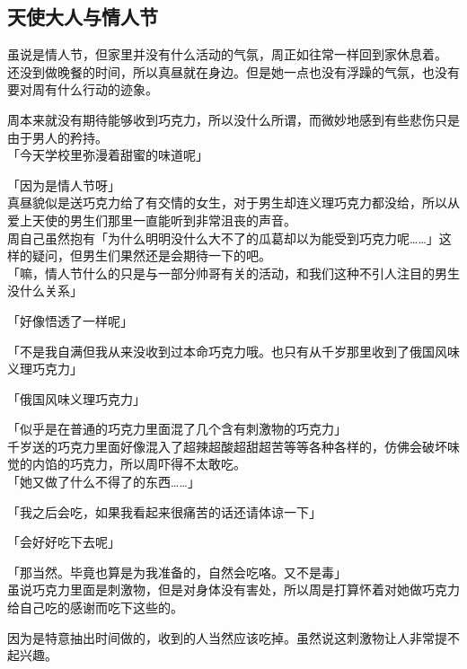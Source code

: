 \subsection{天使大人与情人节}

虽说是情人节，但家里并没有什么活动的气氛，周正如往常一样回到家休息着。\\

还没到做晚餐的时间，所以真昼就在身边。但是她一点也没有浮躁的气氛，也没有要对周有什么行动的迹象。

周本来就没有期待能够收到巧克力，所以没什么所谓，而微妙地感到有些悲伤只是由于男人的矜持。\\

「今天学校里弥漫着甜蜜的味道呢」

「因为是情人节呀」\\

真昼貌似是送巧克力给了有交情的女生，对于男生却连义理巧克力都没给，所以从爱上天使的男生们那里一直能听到非常沮丧的声音。\\

周自己虽然抱有「为什么明明没什么大不了的瓜葛却以为能受到巧克力呢……」这样的疑问，但男生们果然还是会期待一下的吧。\\

「嘛，情人节什么的只是与一部分帅哥有关的活动，和我们这种不引人注目的男生没什么关系」

「好像悟透了一样呢」

「不是我自满但我从来没收到过本命巧克力哦。也只有从千岁那里收到了俄国风味义理巧克力」

「俄国风味义理巧克力」

「似乎是在普通的巧克力里面混了几个含有刺激物的巧克力」\\

千岁送的巧克力里面好像混入了超辣超酸超甜超苦等等各种各样的，仿佛会破坏味觉的内馅的巧克力，所以周吓得不太敢吃。\\

「她又做了什么不得了的东西……」

「我之后会吃，如果我看起来很痛苦的话还请体谅一下」

「会好好吃下去呢」

「那当然。毕竟也算是为我准备的，自然会吃咯。又不是毒」\\

虽说巧克力里面是刺激物，但是对身体没有害处，所以周是打算怀着对她做巧克力给自己吃的感谢而吃下这些的。

因为是特意抽出时间做的，收到的人当然应该吃掉。虽然说这刺激物让人非常提不起兴趣。\\

